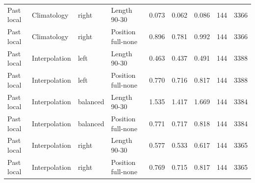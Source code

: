 \begin{table}
{\begin{tabular}{llllrrrrr}
Past local & Climatology & right & Length 90-30 & 0.073 & 0.062 & 0.086 & 144 & 3366 \\
Past local & Climatology & right & Position full-none & 0.896 & 0.781 & 0.992 & 144 & 3366 \\
Past local & Interpolation & left & Length 90-30 & 0.463 & 0.437 & 0.491 & 144 & 3388 \\
Past local & Interpolation & left & Position full-none & 0.770 & 0.716 & 0.817 & 144 & 3388 \\
Past local & Interpolation & balanced & Length 90-30 & 1.535 & 1.417 & 1.669 & 144 & 3384 \\
Past local & Interpolation & balanced & Position full-none & 0.771 & 0.717 & 0.818 & 144 & 3384 \\
Past local & Interpolation & right & Length 90-30 & 0.577 & 0.533 & 0.617 & 144 & 3365 \\
Past local & Interpolation & right & Position full-none & 0.769 & 0.715 & 0.817 & 144 & 3365 \\
\bottomrule
\end{tabular}
}
\end{table}

\begin{table}
\caption{Trajectory quality at 128 draws on each role's intersection of supported cases. Unsupported state-model cases are reported separately and never treated as zero uncertainty. State conditioning uses visible water residuals and available air/flow states; common-subset performance is supplementary development, not new confirmation.}
\label{tab:followup_trajectory}
\centering
\scriptsize
{}
\end{table}

